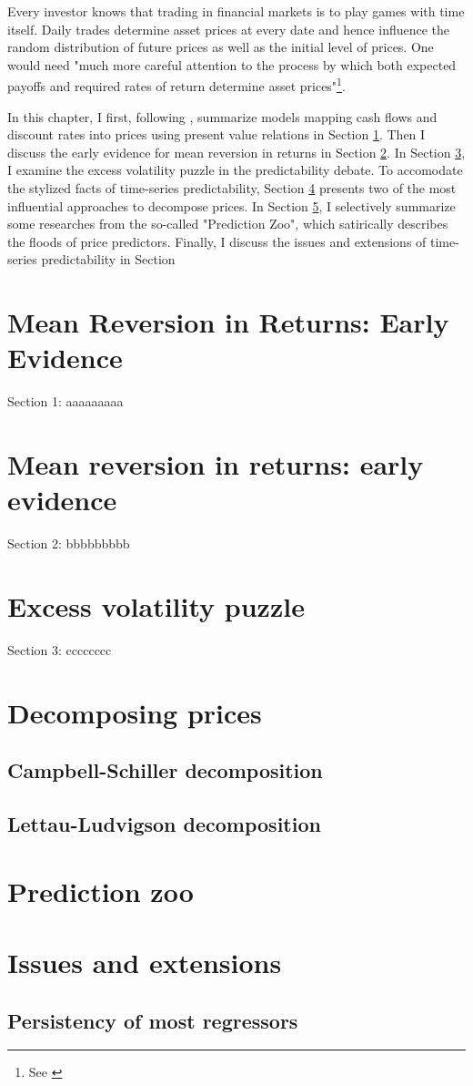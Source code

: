 \minitoc

\vspace{0.5cm}
Every investor knows that trading in financial markets is to play
games with time itself. Daily trades determine asset prices at every date and hence
influence the random distribution of future prices as well as the initial
level of prices. One would need "much more careful attention to the process
by which both expected payoffs and required rates of return determine
asset prices"\footnote{See \citet[p.~121]{campbell2017financial}}.

In this chapter, I first, following \citet[Chapter~5]{campbell2017financial}, summarize models 
mapping cash flows and discount rates into prices using present value relations in Section \ref{chap1:sec1}.
Then I discuss the early evidence for mean reversion in returns in Section \ref{chap1:sec2}.
In Section \ref{chap1:sec3}, I examine the excess volatility puzzle in the predictability debate.
To accomodate the stylized facts of time-series predictability, Section \ref{chap1:sec4}
presents two of the most influential approaches to decompose prices. In Section \ref{chap1:sec5},
I selectively summarize some researches from the so-called "Prediction Zoo", which satirically 
describes the floods of price predictors. Finally, I discuss the issues and extensions of time-series
predictability in Section


\section{Mean Reversion in Returns: Early Evidence}\label{chap1:sec1}
Section 1: aaaaaaaaa

\section{Mean reversion in returns: early evidence}\label{chap1:sec2}
Section 2: bbbbbbbbb

\section{Excess volatility puzzle}\label{chap1:sec3}
Section 3: cccccccc

\section{Decomposing prices}\label{chap1:sec4}
\subsection{Campbell-Schiller decomposition}\label{chap1:sec4:ssec1}
\subsection{Lettau-Ludvigson decomposition}\label{chap1:sec4:ssec2}

\section{Prediction zoo}\label{chap1:sec5}

\section{Issues and extensions}\label{chap1:sec6}
\subsection{Persistency of most regressors}\label{chap1:sec6:ssec1}
